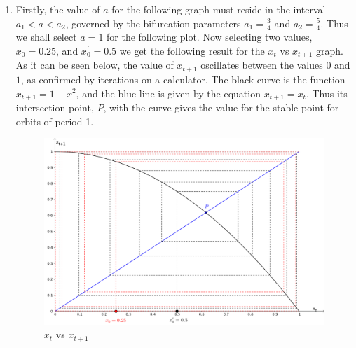 \documentclass[a4paper]{article}
\begin{document}
\begin{enumerate}[label=\textbf{\arabic*.}]
\begin{enumerate}
		Now considering the second of the two cases, we get the following result.

		\begin{align*}
		\left|4(1-a) \right| & > 1\\
		\therefore 4(1-a) & < -1\\
		\therefore  4 - 4a & < -1\\
		\therefore -4a & < -5\\
		\therefore a & > \frac{5}{4}\\
		\end{align*}

		As a result, we get the following two intervals upon which $a$ must lie for a periodic orbit of period 2 to be unstable. $\displaystyle{a \in \left[0,\frac{3}{4}\right)}$ and $\displaystyle{a \in \left(\frac{5}{4},2 \right]}$. The restrictions are as a consequence of the definition of $a \in [0,2]$. The value $a_2$, the parameter that determines when the orbit of period 2 loses is stability is $a_2 = \frac{5}{4}$.

		\pagebreak

		\item Firstly, the value of $a$ for the following graph must reside in the interval $a_1 < a < a_2$, governed by the bifurcation parameters $a_1 = \frac{3}{4}$ and $a_2 = \frac{5}{4}$. Thus we shall select $a = 1$ for the following plot. Now selecting two values, $x_0 = 0.25$, and $x_0^\prime = 0.5$ we get the following result for the $x_t$ vs $x_{t+1}$ graph. As it can be seen below, the value of $x_{t+1}$ oscillates between the values $0$ and $1$, as confirmed by iterations on a calculator. The black curve is the function $x_{t+1} = 1 -x^2$, and the blue line is given by the equation $x_{t+1} = x_t$. Thus its intersection point, $P$, with the curve gives the value for the stable point for orbits of period 1.

		\begin{center}
		\begin{figure}[h!]
		\caption{$x_t$ vs $x_{t+1}$}
			\includegraphics[width=\linewidth]{stable_graph_4.png}
		\end{figure}
		\end{center}



\end{enumerate}
\end{enumerate}
\end{document}
